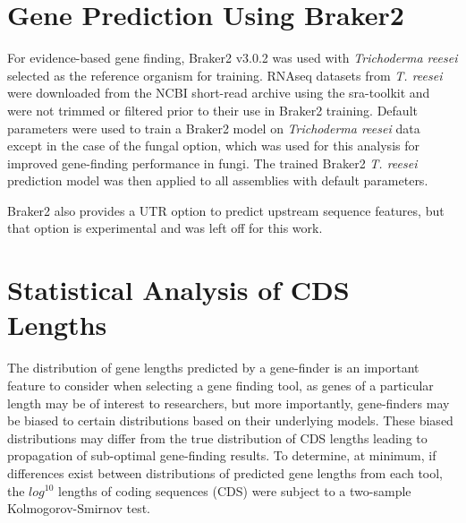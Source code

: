 %

\section{Gene Prediction Using Braker2}
\label{met:braker2}

For evidence-based gene finding, Braker2 v3.0.2\cite{Bruna2021} was
used with \textit{Trichoderma reesei} selected as the reference
organism for training. RNAseq datasets from \textit{T. reesei} were
downloaded from the NCBI short-read archive using the
sra-toolkit\cite{NCBI2025} and were not trimmed or filtered prior to
their use in Braker2 training. Default parameters were used to train a
Braker2 model on \textit{Trichoderma reesei} data except in the case
of the fungal option, which was used for this analysis for improved
gene-finding performance in fungi. The trained Braker2
\textit{T. reesei} prediction model was then applied to all assemblies
with default parameters.

Braker2 also provides a UTR option to predict upstream sequence
features, but that option is experimental and was left off for this
work.


\section{Statistical Analysis of CDS Lengths}
\label{met:cds-stats}
The distribution of gene lengths predicted by a gene-finder is an
important feature to consider when selecting a gene finding tool, as
genes of a particular length may be of interest to researchers, but
more importantly, gene-finders may be biased to certain distributions
based on their underlying models. These biased distributions may
differ from the true distribution of CDS lengths leading to
propagation of sub-optimal gene-finding results. To determine, at
minimum, if differences exist between distributions of predicted gene
lengths from each tool, the $log^10$ lengths of coding sequences (CDS)
were subject to a two-sample Kolmogorov-Smirnov test\cite{ref1}. 

